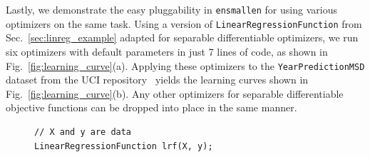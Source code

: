 \documentclass{article}
\begin{document}
Lastly, we demonstrate the easy pluggability in {\tt ensmallen}
for using various optimizers on the same task.
Using a version of \texttt{\small LinearRegressionFunction} from Sec.~\ref{sec:linreg_example}
adapted for separable differentiable optimizers,
we run six optimizers with default parameters in just 7 lines of code,
as shown in Fig.~\ref{fig:learning_curve}(a).
Applying these optimizers to the \texttt{\small YearPredictionMSD}
dataset from the UCI repository~\cite{ucimlrepository}
yields the learning curves shown in Fig.~\ref{fig:learning_curve}(b).
Any other optimizers for separable differentiable objective
functions can be dropped into place in the same manner.


\begin{figure}[h!]
\begin{minipage}[t]{1\textwidth}
\begin{adjustbox}{scale={0.90}{0.90}}
\begin{minipage}{0.48\textwidth}
\centering
\begin{verbatim}
// X and y are data
LinearRegressionFunction lrf(X, y);


\end{verbatim}
\end{minipage}
\end{adjustbox}
\end{minipage}
\end{figure}
\end{document}
